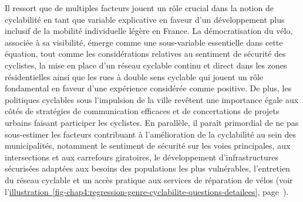 \begin{refsegment}
Il ressort que de multiples facteurs jouent un rôle crucial dans la notion de cyclabilité en tant que variable explicative en faveur d'un développement plus inclusif de la mobilité individuelle légère en France. La démocratisation du vélo, associée à sa visibilité, émerge comme une sous-variable essentielle dans cette équation, tout comme les considérations relatives au sentiment de sécurité des cyclistes, la mise en place d'un réseau cyclable continu et direct dans les zones résidentielles ainsi que les rues à double sens cyclable qui jouent un rôle fondamental en faveur d'une expérience considérée comme positive. De plus, les politiques cyclables sous l'impulsion de la ville revêtent une importance égale aux côtés de stratégies de communication efficaces et de concertations de projets urbains faisant participer les cyclistes. En parallèle, il paraît primordial de ne pas sous-estimer les facteurs contribuant à l'amélioration de la cyclabilité au sein des municipalités, notamment le sentiment de sécurité sur les voies principales, aux intersections et aux carrefours giratoires, le développement d'infrastructures sécurisées adaptées aux besoins des populations les plus vulnérables, l'entretien du réseau cyclable et un accès pratique aux services de réparation de vélos (voir l'\hyperref[fig-chap4:regression-genre-cyclabilite-questions-detailees]{illustration~\ref{fig-chap4:regression-genre-cyclabilite-questions-detailees}}, page~\pageref{fig-chap4:regression-genre-cyclabilite-questions-detailees}).%


\end{refsegment}
